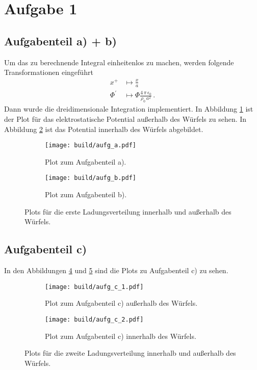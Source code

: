 \section*{Aufgabe 1}
\subsection*{Aufgabenteil a) + b)}
Um das zu berechnende Integral einheitenlos zu machen, werden folgende Transformationen
eingeführt
\begin{align*}
  x^+ &\mapsto \frac{x}{a} \\
  \Phi^{'} &\mapsto \Phi  \frac{4\, \pi \, \epsilon_0}{\rho_0 \, a^2} \, .
\end{align*}
Dann wurde die dreidimensionale Integration implementiert. In Abbildung \ref{subfig:a}
ist der Plot für das elektrostatische Potential außerhalb des Würfels zu sehen.
In Abbildung \ref{subfig:b} ist das Potential innerhalb des Würfels abgebildet.
\begin{figure}
  \centering
  \begin{subfigure}{0.48\textwidth}
    \centering
    \texttt{[image: build/aufg\_a.pdf]}
    \caption{Plot zum Aufgabenteil a).}
    \label{subfig:a}
  \end{subfigure}
  \begin{subfigure}{0.48\textwidth}
    \centering
    \texttt{[image: build/aufg\_b.pdf]}
    \caption{Plot zum Aufgabenteil b).}
    \label{subfig:b}
  \end{subfigure}
  \caption{Plots für die erste Ladungsverteilung innerhalb und außerhalb
  des Würfels.}
  \label{fig:1}
\end{figure}

\subsection*{Aufgabenteil c)}
In den Abbildungen \ref{subfig:c_1} und \ref{subfig:c_2} sind die Plots zu
Aufgabenteil c) zu sehen.
\begin{figure}
  \centering
  \begin{subfigure}{0.48\textwidth}
    \centering
    \texttt{[image: build/aufg\_c\_1.pdf]}
    \caption{Plot zum Aufgabenteil c) außerhalb des Würfels.}
    \label{subfig:c_1}
  \end{subfigure}
  \begin{subfigure}{0.48\textwidth}
    \centering
    \texttt{[image: build/aufg\_c\_2.pdf]}
    \caption{Plot zum Aufgabenteil c) innerhalb des Würfels.}
    \label{subfig:c_2}
  \end{subfigure}
  \caption{Plots für die zweite Ladungsverteilung innerhalb und außerhalb
  des Würfels.}
  \label{fig:2}
\end{figure}
